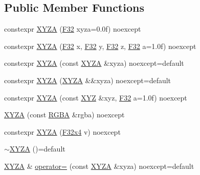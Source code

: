 \subsection*{Public Member Functions}
\begin{DoxyCompactItemize}
\item 
constexpr \mbox{\hyperlink{structmage_1_1_x_y_z_a_ab954075ab032465c9199870646a2718b}{X\+Y\+ZA}} (\mbox{\hyperlink{namespacemage_aa97e833b45f06d60a0a9c4fc22ae02c0}{F32}} xyza=0.\+0f) noexcept
\item 
constexpr \mbox{\hyperlink{structmage_1_1_x_y_z_a_abe082fe71a6b7f7a855b65f5491e24d6}{X\+Y\+ZA}} (\mbox{\hyperlink{namespacemage_aa97e833b45f06d60a0a9c4fc22ae02c0}{F32}} x, \mbox{\hyperlink{namespacemage_aa97e833b45f06d60a0a9c4fc22ae02c0}{F32}} y, \mbox{\hyperlink{namespacemage_aa97e833b45f06d60a0a9c4fc22ae02c0}{F32}} z, \mbox{\hyperlink{namespacemage_aa97e833b45f06d60a0a9c4fc22ae02c0}{F32}} a=1.\+0f) noexcept
\item 
constexpr \mbox{\hyperlink{structmage_1_1_x_y_z_a_a9fdc619e5081ac4ffd6f880ebe49311e}{X\+Y\+ZA}} (const \mbox{\hyperlink{structmage_1_1_x_y_z_a}{X\+Y\+ZA}} \&xyza) noexcept=default
\item 
constexpr \mbox{\hyperlink{structmage_1_1_x_y_z_a_ad5a2327287cd23d1e5bb1bb1b850affd}{X\+Y\+ZA}} (\mbox{\hyperlink{structmage_1_1_x_y_z_a}{X\+Y\+ZA}} \&\&xyza) noexcept=default
\item 
constexpr \mbox{\hyperlink{structmage_1_1_x_y_z_a_a0694b46dd33304f23ca21c0cde51783d}{X\+Y\+ZA}} (const \mbox{\hyperlink{structmage_1_1_x_y_z}{X\+YZ}} \&xyz, \mbox{\hyperlink{namespacemage_aa97e833b45f06d60a0a9c4fc22ae02c0}{F32}} a=1.\+0f) noexcept
\item 
\mbox{\hyperlink{structmage_1_1_x_y_z_a_a8571290c4ba9eaf9d33da17f30b8ac0f}{X\+Y\+ZA}} (const \mbox{\hyperlink{structmage_1_1_r_g_b_a}{R\+G\+BA}} \&rgba) noexcept
\item 
constexpr \mbox{\hyperlink{structmage_1_1_x_y_z_a_a6065beb34f7d2a3ac0a0838a96542aa6}{X\+Y\+ZA}} (\mbox{\hyperlink{namespacemage_a759aaad2fdc75aa93b5b614eb01712c4}{F32x4}} v) noexcept
\item 
\mbox{\hyperlink{structmage_1_1_x_y_z_a_a2f706527b01ff7e86099b76180ebd25f}{$\sim$\+X\+Y\+ZA}} ()=default
\item 
\mbox{\hyperlink{structmage_1_1_x_y_z_a}{X\+Y\+ZA}} \& \mbox{\hyperlink{structmage_1_1_x_y_z_a_a203b9033f20f1d47d654e3bba2e2a62f}{operator=}} (const \mbox{\hyperlink{structmage_1_1_x_y_z_a}{X\+Y\+ZA}} \&xyza) noexcept=default
\item 

\end{DoxyCompactItemize}
